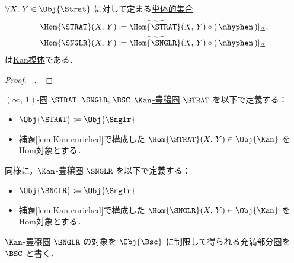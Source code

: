 \documentclass[TQFT_main]{subfiles}
\begin{document}
\begin{mylem}[label=lem:Kan-enriched]{}
    $\forall X,\, Y \in \Obj{\Strat}$ に対して定まる\hyperref[def:sSet]{単体的集合}
    \begin{align}
        \Hom{\STRAT}(X,\, Y) &\coloneqq \widetilde{\Hom{\STRAT}}(X,\, Y) \circ (\, \mhyphen \,)|_{\Delta}, \\
        \Hom{\SNGLR}(X,\, Y) &\coloneqq \widetilde{\Hom{\SNGLR}}(X,\, Y) \circ (\, \mhyphen \,)|_{\Delta}
    \end{align}
    は\hyperref[def:KanCplx]{Kan複体}である．
\end{mylem}

\begin{proof}
    ~\cite[Lemma 4.1.4.]{AFT2014stratified}．
\end{proof}

\begin{mydef}[label=def:Strat-infty]{{$(\infty,\, 1)$}-圏 {$\STRAT,\, \SNGLR,\, \BSC$}}
    \hyperref[def:enriched]{$\Kan$-豊穣圏} $\STRAT$ を以下で定義する：
    \begin{itemize}
        \item $\Obj{\STRAT} \coloneqq \Obj{\Snglr}$
        \item 補題\ref{lem:Kan-enriched}で構成した $\Hom{\STRAT}(X,\, Y) \in \Obj{\Kan}$ をHom対象とする．
    \end{itemize}
    同様に，$\Kan$-豊穣圏 $\SNGLR$ を以下で定義する：
    \begin{itemize}
        \item $\Obj{\SNGLR} \coloneqq \Obj{\Snglr}$
        \item 補題\ref{lem:Kan-enriched}で構成した $\Hom{\SNGLR}(X,\, Y) \in \Obj{\Kan}$ をHom対象とする．
    \end{itemize}
    
    \tcblower

    $\Kan$-豊穣圏 $\SNGLR$ の対象を \hyperref[def:Snglr]{$\Obj{\Bsc}$} に制限して得られる充満部分圏を $\BSC$ と書く．

    
\end{mydef}
\end{document}
